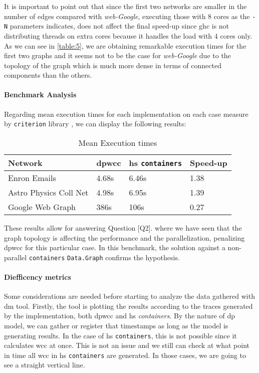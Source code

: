 It is important to point out that since the first two networks are smaller in the number of edges compared with \emph{web-Google}, 
executing those with $8$ cores as the \texttt{-N} parameters indicates, does not affect the final speed-up since \acrshort{ghc} 
is not distributing threads on extra cores because it handles the load with $4$ cores only.
As we can see in \autoref{table:5}, we are obtaining remarkable execution times for the first two graphs and it seems not to be the case 
for \textit{web-Google} due to the topology of the graph which is much more dense in terms of connected components than the others.

\paragraph{Benchmark Analysis} Regarding mean execution times for each implementation on each case measure by \texttt{criterion} library \cite{criterion}, we can display the following results:

\begin{table}[H]
  \centering
  \begin{tabular}{|l|l|l|l|}
   \hline
   \textbf{Network} & \textbf{\acrshort{dpwcc}} & \textbf{\acrshort{hs} \texttt{containers}} & \textbf{Speed-up}\\
   \hline
   Enron Emails & 4.68s &  6.46s & 1.38\\
   \hline
   Astro Physics Coll Net & 4.98s & 6.95s  & 1.39\\
   \hline
   Google Web Graph & 386s & 106s & 0.27\\
   \hline
  \end{tabular}
 \caption{Mean Execution times}
 \label{table:6}
 \end{table}

These results allow for answering Question [Q2]. where we have seen that the graph topology is affecting the performance and the parallelization, penalizing \acrshort{dpwcc} for this particular case. In this benchmark, 
the solution against a non-parallel \texttt{containers} \texttt{Data.Graph} confirms the hypothesis. 

\paragraph{Diefficency metrics} Some considerations are needed before starting to analyze the data gathered with \acrfull{dm} tool. Firstly, the tool is plotting the results according to the traces generated by the implementation, 
both \acrshort{dpwcc} and \acrshort{hs} \emph{containers}. By the nature of \acrshort{dp} model, we can gather or register that timestamps as long as the model is generating results. In the case of \acrshort{hs} \texttt{containers}, this is not possible since it 
calculates \acrshort{wcc} at once. This is not an issue and we still can check at what point in time all \acrshort{wcc} in \acrshort{hs} \texttt{containers} are generated. In those cases, we are going to see a straight vertical line. 

